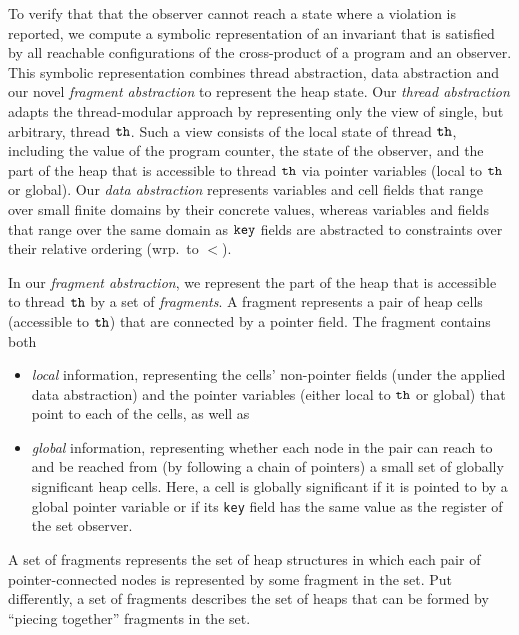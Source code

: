 To verify that that the observer cannot reach a state where a violation
is reported, we compute a symbolic representation
of an invariant that is satisfied by all reachable configurations of
the cross-product of a program  and an observer.
This symbolic representation combines thread abstraction, data abstraction
and our novel {\em fragment abstraction} to represent the heap state.
Our {\em thread abstraction} adapts the thread-modular approach by representing only the view of single, but arbitrary, thread ${\tt th}$. Such a view consists of
the local state of thread ${\tt th}$, including the value of the program counter,
the state of the observer, and
the part of the heap that is accessible to thread ${\tt th}$ via pointer variables (local to ${\tt th}$ or global).
Our {\em data abstraction} represents variables and cell
fields that range over small finite domains by their concrete values,
whereas variables and fields that range over the same domain as $\tt key$
fields are abstracted to constraints over their relative ordering (wrp.\ to $<$).

In our {\em fragment abstraction}, we represent the part of the heap
that is accessible to thread ${\tt th}$ by a set of {\em fragments}. 
A fragment represents a pair of heap cells (accessible to ${\tt th}$)
that are connected by a pointer field.
The fragment contains both
\begin{itemize}
  \item {\em local} information, representing the cells'
  non-pointer fields (under the applied data abstraction) and 
  the pointer variables (either local to ${\tt th}$ or global)
  that point to each of the cells, as well as
\item {\em global} information, representing whether
  each node in the pair can reach to and be reached from
  (by following a chain of pointers) a small set of globally significant
  heap cells. Here, a cell is globally significant if it is pointed to by a
  global pointer variable or if its 
  {\tt key} field has the  same value as the register of the set observer.
\end{itemize}
A set of fragments represents the set of heap
structures in which each pair of pointer-connected nodes is represented by some
fragment in the set.
Put differently, a set of fragments describes the set of heaps that can be formed by
``piecing together'' fragments in the set.

